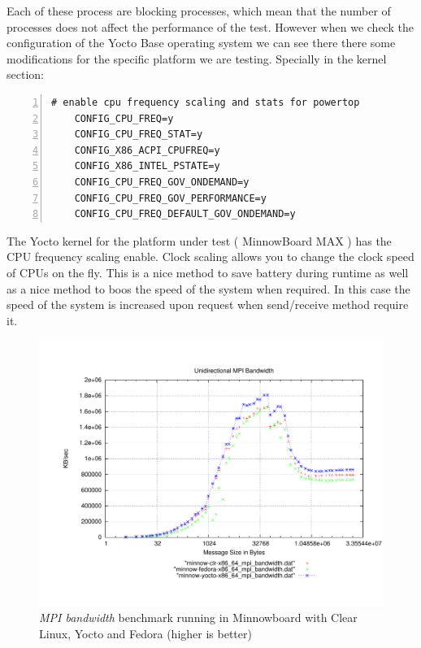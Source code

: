 Each of these process are blocking processes, which mean that the number of
processes does not affect the performance of the test. However when we check
the configuration of the Yocto Base operating system we can see there there
some modifications for the specific platform we are testing. Specially in the
kernel section: 

\begin{lstlisting}[frame=single,numbers=left]
    # enable cpu frequency scaling and stats for powertop
    CONFIG_CPU_FREQ=y
    CONFIG_CPU_FREQ_STAT=y
    CONFIG_X86_ACPI_CPUFREQ=y
    CONFIG_X86_INTEL_PSTATE=y
    CONFIG_CPU_FREQ_GOV_ONDEMAND=y
    CONFIG_CPU_FREQ_GOV_PERFORMANCE=y
    CONFIG_CPU_FREQ_DEFAULT_GOV_ONDEMAND=y
\end{lstlisting}

The Yocto kernel for the platform under test ( MinnowBoard MAX ) has the CPU
frequency scaling enable. Clock scaling allows you to change the clock speed of
CPUs on the fly. This is a nice method to save battery during runtime as well
as a nice method to boos the speed of the system when required. In this case
the speed of the system is increased upon request when send/receive method
require it.

\begin{figure}[H]
\centering
\includegraphics[width=1 \textwidth]{images/mpbench_yocto_experiments/mpi_bandwidth.pdf}
\caption{\textit{MPI bandwidth} benchmark running in Minnowboard with Clear Linux,
Yocto and Fedora (higher is better)}
\label{mpi_bandwidth_yocto}
\end{figure}


